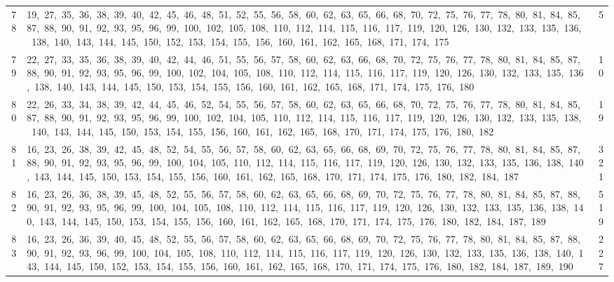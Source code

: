 \begin{longtable}{c|p{}|r}
78 & 19,\ 27,\ 35,\ 36,\ 38,\ 39,\ 40,\ 42,\ 45,\ 46,\ 48,\ 51,\ 52,\ 55,\ 56,\ 58,\ 60,\ 62,\ 63,\ 65,\ 66,\ 68,\ 70,\ 72,\ 75,\ 76,\ 77,\ 78,\ 80,\ 81,\ 84,\ 85,\ 87,\ 88,\ 90,\ 91,\ 92,\ 93,\ 95,\ 96,\ 99,\ 100,\ 102,\ 105,\ 108,\ 110,\ 112,\ 114,\ 115,\ 116,\ 117,\ 119,\ 120,\ 126,\ 130,\ 132,\ 133,\ 135,\ 136,\ 138,\ 140,\ 143,\ 144,\ 145,\ 150,\ 152,\ 153,\ 154,\ 155,\ 156,\ 160,\ 161,\ 162,\ 165,\ 168,\ 171,\ 174,\ 175 & 5 \\
79 & 22,\ 27,\ 33,\ 35,\ 36,\ 38,\ 39,\ 40,\ 42,\ 44,\ 46,\ 51,\ 55,\ 56,\ 57,\ 58,\ 60,\ 62,\ 63,\ 66,\ 68,\ 70,\ 72,\ 75,\ 76,\ 77,\ 78,\ 80,\ 81,\ 84,\ 85,\ 87,\ 88,\ 90,\ 91,\ 92,\ 93,\ 95,\ 96,\ 99,\ 100,\ 102,\ 104,\ 105,\ 108,\ 110,\ 112,\ 114,\ 115,\ 116,\ 117,\ 119,\ 120,\ 126,\ 130,\ 132,\ 133,\ 135,\ 136,\ 138,\ 140,\ 143,\ 144,\ 145,\ 150,\ 153,\ 154,\ 155,\ 156,\ 160,\ 161,\ 162,\ 165,\ 168,\ 171,\ 174,\ 175,\ 176,\ 180 & 10 \\
80 & 22,\ 26,\ 33,\ 34,\ 38,\ 39,\ 42,\ 44,\ 45,\ 46,\ 52,\ 54,\ 55,\ 56,\ 57,\ 58,\ 60,\ 62,\ 63,\ 65,\ 66,\ 68,\ 70,\ 72,\ 75,\ 76,\ 77,\ 78,\ 80,\ 81,\ 84,\ 85,\ 87,\ 88,\ 90,\ 91,\ 92,\ 93,\ 95,\ 96,\ 99,\ 100,\ 102,\ 104,\ 105,\ 110,\ 112,\ 114,\ 115,\ 116,\ 117,\ 119,\ 120,\ 126,\ 130,\ 132,\ 133,\ 135,\ 138,\ 140,\ 143,\ 144,\ 145,\ 150,\ 153,\ 154,\ 155,\ 156,\ 160,\ 161,\ 162,\ 165,\ 168,\ 170,\ 171,\ 174,\ 175,\ 176,\ 180,\ 182 & 19 \\
81 & 16,\ 23,\ 26,\ 38,\ 39,\ 42,\ 45,\ 48,\ 52,\ 54,\ 55,\ 56,\ 57,\ 58,\ 60,\ 62,\ 63,\ 65,\ 66,\ 68,\ 69,\ 70,\ 72,\ 75,\ 76,\ 77,\ 78,\ 80,\ 81,\ 84,\ 85,\ 87,\ 88,\ 90,\ 91,\ 92,\ 93,\ 95,\ 96,\ 99,\ 100,\ 104,\ 105,\ 110,\ 112,\ 114,\ 115,\ 116,\ 117,\ 119,\ 120,\ 126,\ 130,\ 132,\ 133,\ 135,\ 136,\ 138,\ 140,\ 143,\ 144,\ 145,\ 150,\ 153,\ 154,\ 155,\ 156,\ 160,\ 161,\ 162,\ 165,\ 168,\ 170,\ 171,\ 174,\ 175,\ 176,\ 180,\ 182,\ 184,\ 187 & 321 \\
82 & 16,\ 23,\ 26,\ 36,\ 38,\ 39,\ 45,\ 48,\ 52,\ 55,\ 56,\ 57,\ 58,\ 60,\ 62,\ 63,\ 65,\ 66,\ 68,\ 69,\ 70,\ 72,\ 75,\ 76,\ 77,\ 78,\ 80,\ 81,\ 84,\ 85,\ 87,\ 88,\ 90,\ 91,\ 92,\ 93,\ 95,\ 96,\ 99,\ 100,\ 104,\ 105,\ 108,\ 110,\ 112,\ 114,\ 115,\ 116,\ 117,\ 119,\ 120,\ 126,\ 130,\ 132,\ 133,\ 135,\ 136,\ 138,\ 140,\ 143,\ 144,\ 145,\ 150,\ 153,\ 154,\ 155,\ 156,\ 160,\ 161,\ 162,\ 165,\ 168,\ 170,\ 171,\ 174,\ 175,\ 176,\ 180,\ 182,\ 184,\ 187,\ 189 & 519 \\
83 & 16,\ 23,\ 26,\ 36,\ 39,\ 40,\ 45,\ 48,\ 52,\ 55,\ 56,\ 57,\ 58,\ 60,\ 62,\ 63,\ 65,\ 66,\ 68,\ 69,\ 70,\ 72,\ 75,\ 76,\ 77,\ 78,\ 80,\ 81,\ 84,\ 85,\ 87,\ 88,\ 90,\ 91,\ 92,\ 93,\ 96,\ 99,\ 100,\ 104,\ 105,\ 108,\ 110,\ 112,\ 114,\ 115,\ 116,\ 117,\ 119,\ 120,\ 126,\ 130,\ 132,\ 133,\ 135,\ 136,\ 138,\ 140,\ 143,\ 144,\ 145,\ 150,\ 152,\ 153,\ 154,\ 155,\ 156,\ 160,\ 161,\ 162,\ 165,\ 168,\ 170,\ 171,\ 174,\ 175,\ 176,\ 180,\ 182,\ 184,\ 187,\ 189,\ 190 & 227 \\

\end{longtable}
